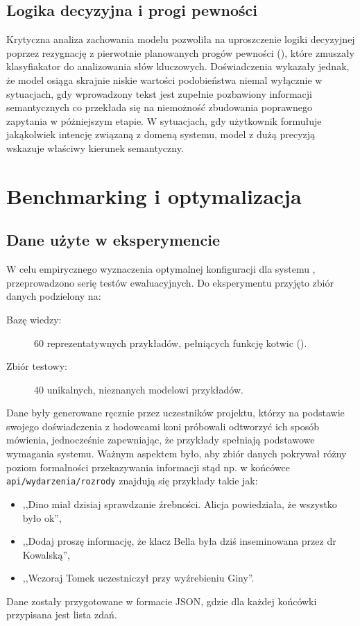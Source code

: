 \subsection*{Logika decyzyjna i progi pewności}

Krytyczna analiza zachowania modelu pozwoliła na uproszczenie logiki decyzyjnej poprzez rezygnację z pierwotnie planowanych progów pewności (), które zmuszały klasyfiakator do analizowania słów kluczowych. Doświadczenia wykazały jednak, że model osiąga skrajnie niskie wartości podobieństwa niemal wyłącznie w sytuacjach, gdy wprowadzony tekst jest zupełnie pozbawiony informacji semantycznych co przekłada się na niemożność zbudowania poprawnego zapytania w póżniejszym etapie. W sytuacjach, gdy użytkownik formułuje jakąkolwiek intencję związaną z domeną systemu, model z dużą precyzją wskazuje właściwy kierunek semantyczny.

\section{Benchmarking i optymalizacja}

\subsection{Dane użyte w eksperymencie}

W celu empirycznego wyznaczenia optymalnej konfiguracji dla systemu , przeprowadzono serię testów ewaluacyjnych. Do eksperymentu przyjęto zbiór danych podzielony na:
\begin{description}
	\item[Bazę wiedzy:] 60 reprezentatywnych przykładów, pełniących funkcję kotwic ().
	\item[Zbiór testowy:] 40 unikalnych, nieznanych modelowi przykładów.
\end{description}

Dane były generowane ręcznie przez uczestników projektu, którzy na podstawie swojego doświadczenia z hodowcami koni próbowali odtworzyć ich sposób mówienia, jednocześnie zapewniając, że przykłady spełniają podstawowe wymagania systemu. Ważnym aspektem było, aby zbiór danych pokrywał różny poziom formalności przekazywania informacji stąd np. w końcówce \texttt{api/wydarzenia/\allowbreak{}rozrody} znajdują się przykłady takie jak:

\begin{itemize}
    \item ,,Dino miał dzisiaj sprawdzanie źrebności. Alicja powiedziała, że wszystko było ok'',
    \item ,,Dodaj proszę informację, że klacz Bella była dziś inseminowana przez dr Kowalską'',
    \item ,,Wczoraj Tomek uczestniczył przy wyźrebieniu Giny''.
\end{itemize}
Dane zostały przygotowane w formacie JSON, gdzie dla każdej końcówki przypisana jest lista zdań.

